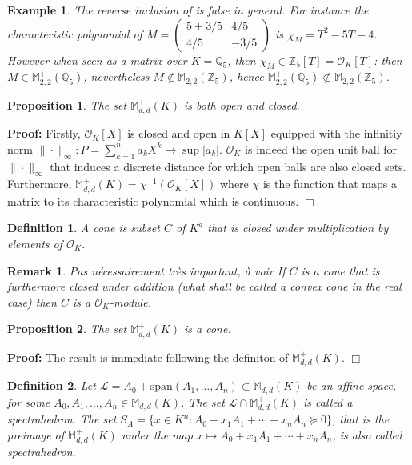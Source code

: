 \documentclass[a4paper,12pt]{article}
\newenvironment{proof}{\hbox{}\vspace{-0.8cm} {\bf Proof:}}{\hfill $\Box$}
\newtheorem{proposition}{Proposition}
\newtheorem{definition}{Definition}
\newtheorem{remark}{Remark}
\newtheorem{example}{Example}
\newcommand{\allmat}{\mathbb{M}} %
\renewcommand{\span}[1]{{\text{span}(#1)}} %
\newcommand{\corentin}[1]{{\color{red} #1}} %
\newcommand{\OK}{\mathcal{O}_K}
\begin{document}
\begin{example}
  The reverse inclusion of  is false in general. For instance the characteristic polynomial of
  $M = \left(\begin{smallmatrix} 5 + {3}/{5} & {4}/{5} \\ {4}/{5} & -{3}/{5} \end{smallmatrix}\right)$ is $\chi_M = T^2-5T-4$. However when seen as a matrix over $K=\mathbb{Q}_5$, then $\chi_M \in \mathbb{Z}_5[T] = \OK[T]$: then $M \in \allmat_{2,2}^+(\mathbb{Q}_5)$, nevertheless $M \not\in \allmat_{2,2}(\mathbb{Z}_5)$, hence $\allmat_{2,2}^+(\mathbb{Q}_5) \not\subset \allmat_{2,2}(\mathbb{Z}_5)$.
\end{example}

\begin{proposition}
  The set $\allmat_{d,d}^+(K)$ is both open and closed.
\end{proposition}
\begin{proof}
Firstly, $\OK[X]$ is closed and open in $K[X]$ equipped with the infinitiy norm $\|\cdot\|_\infty : P = \sum_{k=1}^{n} a_k X^k \to \sup |a_k|$. $\OK$ is indeed the open unit ball for $\|\cdot \|_\infty$ that induces a discrete distance for which open balls are also closed sets.
Furthermore, $\allmat^+_{d,d}(K) = \chi^{-1}(\OK[X]) $ where $\chi$ is the function that maps a matrix to its characteristic polynomial which is continuous.
\end{proof}



\begin{definition}
  A \emph{cone} is subset $C$ of $K^d$ that is closed under multiplication by elements of $\OK$.   
\end{definition}

\begin{remark}
  \corentin{Pas nécessairement très important, à voir}
  If $C$ is a cone that is furthermore closed under addition (what shall be called a convex cone in the real case) then $C$ is a $\OK$-module.
\end{remark}

\begin{proposition}
  The set $\allmat^+_{d,d}(K)$ is a cone.
\end{proposition}
\begin{proof}
  The result is immediate following the definiton of $\allmat^+_{d,d}(K)$.
\end{proof}

\begin{definition}
  \label{def_spectrahedra}
  Let $\mathcal{L} = A_0+\span{A_1,\ldots,A_n} \subset \allmat_{d,d}(K)$ be an affine space, for some
  $A_0,A_1,\ldots,A_n \in \allmat_{d,d}(K)$.
  The set $\mathcal{L} \cap \allmat_{d,d}^+(K)$ is called a \emph{spectrahedron}. The set 
  $S_A = \{x \in K^n : A_0+x_1A_1+\cdots+x_nA_n \succeq 0\}$, that is the preimage of $\allmat_{d,d}^+(K)$
  under the map $x \mapsto A_0+x_1A_1+\cdots+x_nA_n$, is also called spectrahedron.
\end{definition}
\end{document}
